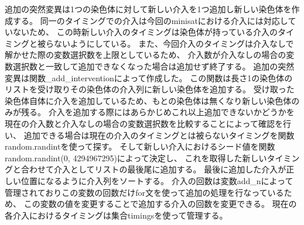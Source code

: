 追加の突然変異は1つの染色体に対して新しい介入を1つ追加し新しい染色体を作成する。
同一のタイミングでの介入は今回のminisatにおける介入には対応していないため、
この時新しい介入のタイミングは染色体が持っている介入のタイミングと被らないようにしている。
また、今回介入のタイミングは介入なしで解かせた際の変数選択数を上限としているため、
介入数が介入なしの場合の変数選択数と一致して追加できなくなった場合は追加せず終了する。
追加の突然変異は関数\_add\_interventionによって作成した。
この関数は長さ1の染色体のリストを受け取りその染色体の介入列に新しい染色体を追加する。
受け取った染色体自体に介入を追加しているため、もとの染色体は無くなり新しい染色体のみが残る。
介入を追加する際にはあらかじめこれ以上追加できないかどうかを現在の介入数と介入なしの場合の変数選択数を比較することによって確認を行い、
追加できる場合は現在の介入のタイミングとは被らないタイミングを関数random.randintを使って探す。
そして新しい介入におけるシード値を関数random.randint(0, 4294967295)によって決定し、
これを取得した新しいタイミングと合わせて介入としてリストの最後尾に追加する。
最後に追加した介入が正しい位置になるように介入列をソートする。
介入の回数は変数add\_nによって管理されておりこの変数の回数だけfor文を使って追加の処理を行なっているため、
この変数の値を変更することで追加する介入の回数を変更できる。
現在の各介入におけるタイミングは集合timingsを使って管理する。
